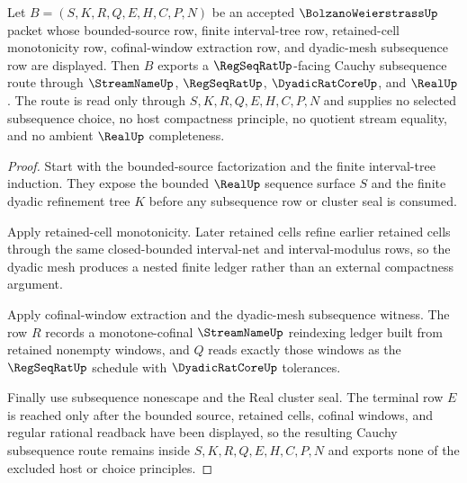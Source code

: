 \begin{theorem}
\label{thm:bolzano-weierstrass-bounded-subsequence-cauchy-extraction}
Let $B=(S,K,R,Q,E,H,C,P,N)$ be an accepted $\BolzanoWeierstrassUp$ packet whose bounded-source row, finite interval-tree row, retained-cell monotonicity row, cofinal-window extraction row, and dyadic-mesh subsequence row are displayed. Then $B$ exports a $\RegSeqRatUp$-facing Cauchy subsequence route through $\StreamNameUp$, $\RegSeqRatUp$, $\DyadicRatCoreUp$, and $\RealUp$. The route is read only through $S,K,R,Q,E,H,C,P,N$ and supplies no selected subsequence choice, no host compactness principle, no quotient stream equality, and no ambient $\RealUp$ completeness.
\end{theorem}
\begin{proof}
Start with the bounded-source factorization and the finite interval-tree induction. They expose the bounded $\RealUp$ sequence surface $S$ and the finite dyadic refinement tree $K$ before any subsequence row or cluster seal is consumed.

Apply retained-cell monotonicity. Later retained cells refine earlier retained cells through the same closed-bounded interval-net and interval-modulus rows, so the dyadic mesh produces a nested finite ledger rather than an external compactness argument.

Apply cofinal-window extraction and the dyadic-mesh subsequence witness. The row $R$ records a monotone-cofinal $\StreamNameUp$ reindexing ledger built from retained nonempty windows, and $Q$ reads exactly those windows as the $\RegSeqRatUp$ schedule with $\DyadicRatCoreUp$ tolerances.

Finally use subsequence nonescape and the Real cluster seal. The terminal row $E$ is reached only after the bounded source, retained cells, cofinal windows, and regular rational readback have been displayed, so the resulting Cauchy subsequence route remains inside $S,K,R,Q,E,H,C,P,N$ and exports none of the excluded host or choice principles.
\end{proof}

